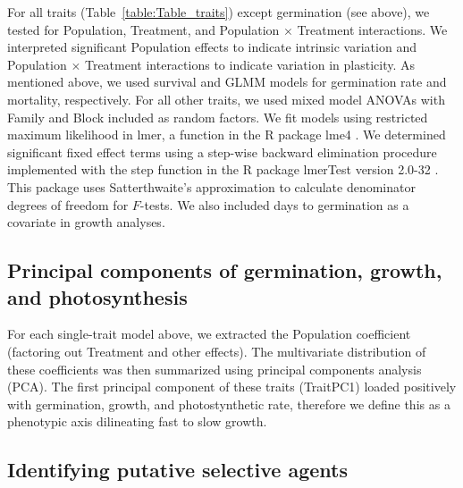 \documentclass[11pt, oneside]{article}
\newcommand{\pkg}[1]{{\fontseries{b}\selectfont #1}}
\begin{document}
For all traits (Table~\ref{table:Table_traits}) except germination (see above), we tested for Population, Treatment, and Population $\times$ Treatment interactions. We interpreted significant Population effects to indicate intrinsic variation and Population $\times$ Treatment interactions to indicate variation in plasticity. As mentioned above, we used survival and GLMM models for germination rate and mortality, respectively. For all other traits, we used mixed model ANOVAs with Family and Block included as random factors. We fit models using restricted maximum likelihood in lmer, a function in the R package \pkg{lme4} \citep{Bates_etal_2015}. We determined significant fixed effect terms using a step-wise backward elimination procedure implemented with the step function in the R package \pkg{lmerTest} version 2.0-32 \citep{Kuznetsova_etal_2016}. This package uses Satterthwaite's approximation to calculate denominator degrees of freedom for $F$-tests. We also included days to germination as a covariate in growth analyses. %

\subsection*{Principal components of germination, growth, and photosynthesis}
For each single-trait model above, we extracted the Population coefficient (factoring out Treatment and other effects). The multivariate distribution of these coefficients was then summarized using principal components analysis (PCA). The first principal component of these traits (TraitPC1) loaded positively with germination, growth, and photostynthetic rate, therefore we define this as a phenotypic axis dilineating fast to slow growth.



\subsection*{Identifying putative selective agents}
\end{document}
